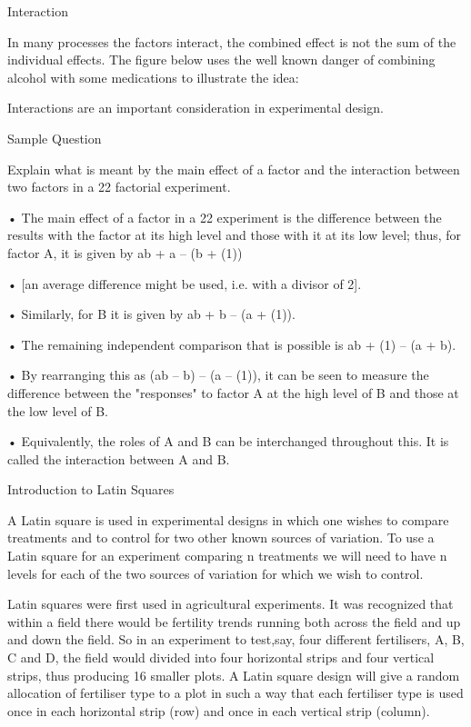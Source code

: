 Interaction 

In many processes the factors interact, the combined effect is not the sum of the individual effects. The figure below uses the well known danger of combining alcohol with some medications to illustrate the idea:









 


Interactions are an important consideration in experimental design.


Sample Question


Explain what is meant by the main effect of a factor and the interaction between two factors in a 22 factorial experiment.

•
The main effect of a factor in a 22 experiment is the difference between the results with the factor at its high level and those with it at its low level; thus, for factor A, it is given by ab + a – (b + (1)) 


•
[an average difference might be used, i.e. with a divisor of 2]. 


•
Similarly, for B it is given by ab + b – (a + (1)).


•
The remaining independent comparison that is possible is ab + (1) – (a + b). 


•
By rearranging this as (ab – b) – (a – (1)), it can be seen to measure the difference between the "responses" to factor A at the high level of B and those at the low level of B. 


•
Equivalently, the roles of A and B can be interchanged throughout this. It is called the interaction between A and B.



Introduction to Latin Squares

A Latin square is used in experimental designs in which one wishes to compare treatments and to control for two other known sources of variation. To use a Latin square for an experiment comparing n treatments we will need to have n levels for each of the two sources of variation for which we wish to control.


Latin squares were first used in agricultural experiments. It was recognized that within a field there would be fertility trends running both across the field and up and down the field. So in an experiment to test,say, four different fertilisers, A, B, C and D, the field would divided into four horizontal strips and four vertical strips, thus producing 16 smaller plots. A Latin square design will give a random allocation of fertiliser type to a plot in such a way that each fertiliser type is used once in each horizontal strip (row) and once in each vertical strip (column).


